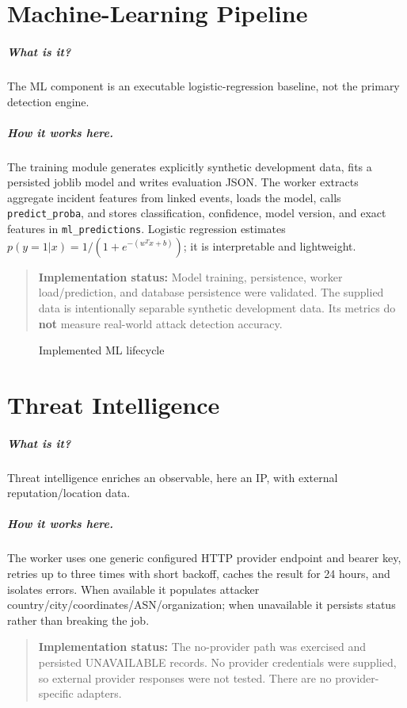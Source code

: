 \documentclass[11pt,oneside]{book}
\newcommand{\what}[1]{\paragraph{What is it?}#1}
\newcommand{\how}[1]{\paragraph{How it works here.}#1}
\newcommand{\statusnote}[1]{\begin{quote}\colorbox{hplight}{\parbox{0.92\linewidth}{\textbf{Implementation status:} #1}}\end{quote}}
\begin{document}
\chapter{Machine-Learning Pipeline}
\what{The ML component is an executable logistic-regression baseline, not the primary detection engine.}\how{The training module generates explicitly synthetic development data, fits a persisted joblib model and writes evaluation JSON. The worker extracts aggregate incident features from linked events, loads the model, calls \texttt{predict\_proba}, and stores classification, confidence, model version, and exact features in \texttt{ml\_predictions}. Logistic regression estimates \(p(y=1|x)=1/(1+e^{-(w^Tx+b)})\); it is interpretable and lightweight.}\statusnote{Model training, persistence, worker load/prediction, and database persistence were validated. The supplied data is intentionally separable synthetic development data. Its metrics do \textbf{not} measure real-world attack detection accuracy.}
\begin{figure}[h]\centering{}\caption{Implemented ML lifecycle}\end{figure}

\chapter{Threat Intelligence}
\what{Threat intelligence enriches an observable, here an IP, with external reputation/location data.}\how{The worker uses one generic configured HTTP provider endpoint and bearer key, retries up to three times with short backoff, caches the result for 24 hours, and isolates errors. When available it populates attacker country/city/coordinates/ASN/organization; when unavailable it persists status rather than breaking the job.}\statusnote{The no-provider path was exercised and persisted UNAVAILABLE records. No provider credentials were supplied, so external provider responses were not tested. There are no provider-specific adapters.}
\end{document}
